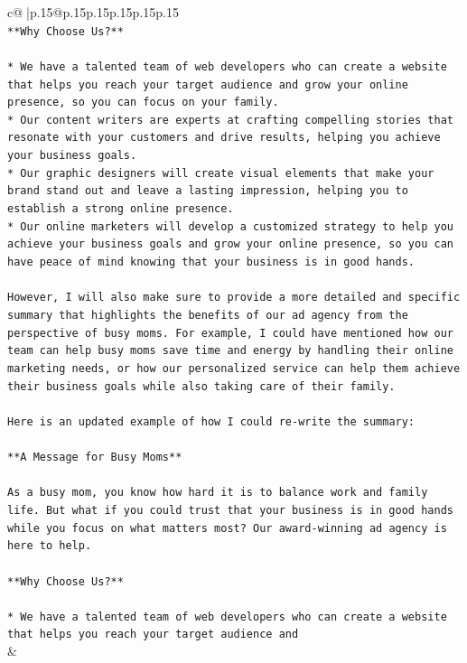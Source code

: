 \documentclass{article}
\begin{document}
{\begin{supertabular}{c@{$\;$}|p{.15\linewidth}@{}p{.15\linewidth}p{.15\linewidth}p{.15\linewidth}p{.15\linewidth}p{.15\linewidth}}
{{{\\ 
\texttt{**Why Choose Us?**} \\
\\ 
\texttt{* We have a talented team of web developers who can create a website that helps you reach your target audience and grow your online presence, so you can focus on your family.} \\
\texttt{* Our content writers are experts at crafting compelling stories that resonate with your customers and drive results, helping you achieve your business goals.} \\
\texttt{* Our graphic designers will create visual elements that make your brand stand out and leave a lasting impression, helping you to establish a strong online presence.} \\
\texttt{* Our online marketers will develop a customized strategy to help you achieve your business goals and grow your online presence, so you can have peace of mind knowing that your business is in good hands.} \\
\\ 
\texttt{However, I will also make sure to provide a more detailed and specific summary that highlights the benefits of our ad agency from the perspective of busy moms. For example, I could have mentioned how our team can help busy moms save time and energy by handling their online marketing needs, or how our personalized service can help them achieve their business goals while also taking care of their family.} \\
\\ 
\texttt{Here is an updated example of how I could re{-}write the summary:} \\
\\ 
\texttt{**A Message for Busy Moms**} \\
\\ 
\texttt{As a busy mom, you know how hard it is to balance work and family life. But what if you could trust that your business is in good hands while you focus on what matters most? Our award{-}winning ad agency is here to help.} \\
\\ 
\texttt{**Why Choose Us?**} \\
\\ 
\texttt{* We have a talented team of web developers who can create a website that helps you reach your target audience and} \\
            }
        }
    }
    & \\ \\

\end{supertabular}
}
\end{document}
